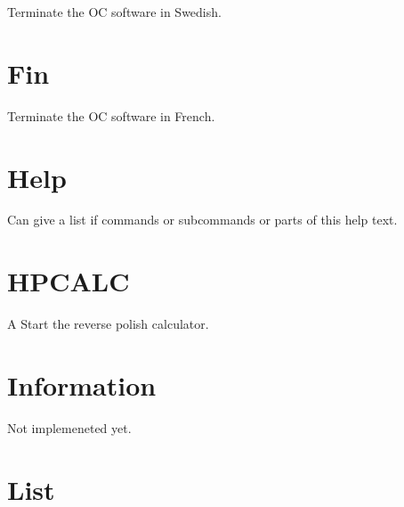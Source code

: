 \documentclass[12pt]{article}
\begin{document}
Terminate the OC software in Swedish.

\section{Fin }

Terminate the OC software in French.

\section{Help }

Can give a list if commands or subcommands or parts of this help text.

\section{HPCALC }

A Start the reverse polish calculator.

\section{Information }

Not implemeneted yet.

\section{List }
\end{document}
